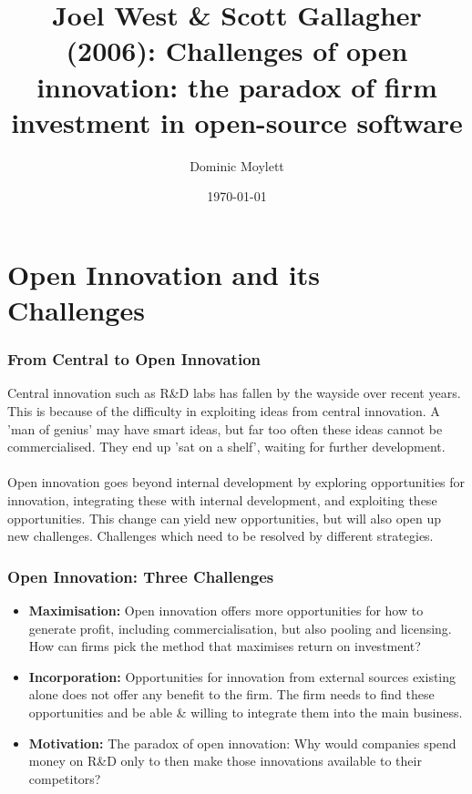 \documentclass{beamer}
\title[Challenges of open innovation]{Joel West \& Scott Gallagher (2006): Challenges of open innovation: the paradox of firm investment in open-source software} %
\author{Dominic Moylett} %
\institute[University of Bristol] %
{
University of Bristol \\ %
\medskip
\textit{dominic.moylett.2011@my.bristol.ac.uk} %
}
\date{\today} %
\begin{document}
\begin{frame}
\titlepage %
\end{frame}


\section{Open Innovation and its Challenges}

\begin{frame}
\frametitle{From Central to Open Innovation}
Central innovation such as R\&D labs has fallen by the wayside over recent years. This is because of the difficulty in exploiting ideas from central innovation. A 'man of genius' may have smart ideas, but far too often these ideas cannot be commercialised. They end up 'sat on a shelf', waiting for further development.\\~\\

Open innovation goes beyond internal development by exploring opportunities for innovation, integrating these with internal development, and exploiting these opportunities. This change can yield new opportunities, but will also open up new challenges. Challenges which need to be resolved by different strategies.
\end{frame}


\begin{frame}
\frametitle{Open Innovation: Three Challenges}
\begin{itemize}
\item \textbf{Maximisation:} Open innovation offers more opportunities for how to generate profit, including commercialisation, but also pooling and licensing. How can firms pick the method that maximises return on investment?
\item \textbf{Incorporation:} Opportunities for innovation from external sources existing alone does not offer any benefit to the firm. The firm needs to find these opportunities and be able \& willing to integrate them into the main business.
\item \textbf{Motivation:} The paradox of open innovation: Why would companies spend money on R\&D only to then make those innovations available to their competitors?
\end{itemize}
\end{frame}
\end{document}
